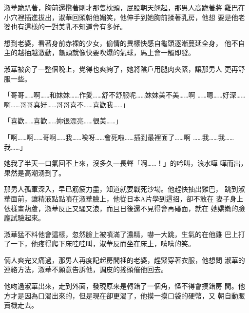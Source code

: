 淑華跪趴著，胸前還攬著剛才那隻枕頭，屁股朝天翹起，那男人高跪著將
雞巴在小穴裡插進拔出，淑華回頭朝他媚笑，他伸手到她胸前揉著乳房，他想
要是他老婆也有這樣的一對美乳不知道會有多好。

想到老婆，看著身前赤裸的少女，偷情的異樣快感自龜頭逐漸蔓延全身，
他不自主的越抽越激動，龜頭就像快要吹爆的氣球，馬上會一觸即發。

淑華被肏了一整個晚上，覺得也爽夠了，她將陰戶用腿肉夾緊，讓那男人
更再舒服一些。

「哥哥……啊……和妹妹……作愛……舒不舒服呢……妹妹美不美……啊
……嗯……好深……啊……哥哥真好……哥哥喜不……喜歡我……」

「喜歡……喜歡……妳很漂亮……很美……」

「啊……啊……哥啊……我……唉呀……會死啦……插到最裡面了……啊
……我……我……我……」

她我了半天一口氣回不上來，沒多久一長聲「啊……！」的吟叫，浪水嘩
嘩而出，果然是高潮湧到了。

那男人孤軍深入，早已筋疲力盡，知道就要戰死沙場。他趕快抽出雞巴，
跳到淑華面前，讓精液點點噴在淑華臉上，他從日本A片學到這招，卻不敢在
妻子身上依樣畫葫蘆，淑華反正又騷又浪，而且日後還不見得會再碰面，就在
她嬌嫩的臉龐試驗起來。

淑華猛不料他會這樣，忽然臉上被噴滿了濃精，嚇一大跳，生氣的在他雞
巴上打了一下，他疼得爬下床哇哇叫，淑華反而坐在床上，嘻嘻的笑。

倆人爽完又痛過，那男人再度記起房間裡的老婆，趕緊穿著衣服，他想問
淑華的連絡方法，淑華不願意告訴他，調皮的搖頭催他回去。

他吻過淑華出來，走到外面，發現原來是轉錯了一個角，怪不得會摸錯房
間。他方才是因為口渴出來的，但是現在卻更渴了，他摸一摸口袋的硬幣，又
朝自動販賣機走去。










